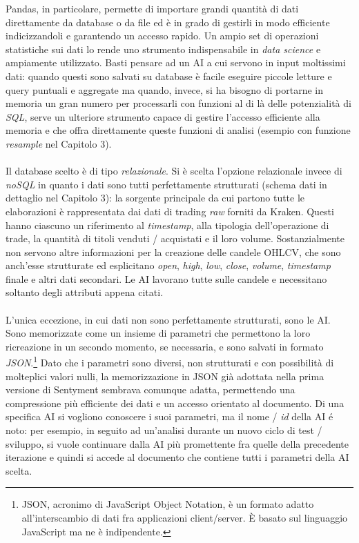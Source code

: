 \documentclass[a4paper,12pt]{report}
\begin{document}
Pandas, in particolare, permette di importare grandi quantità di dati direttamente da database o da file ed è in grado di gestirli in modo efficiente indicizzandoli e garantendo un accesso rapido. Un ampio set di operazioni statistiche sui dati lo rende uno strumento indispensabile in \textit{data science} e ampiamente utilizzato. Basti pensare ad un AI a cui servono in input moltissimi dati: quando questi sono salvati su database è facile eseguire piccole letture e query puntuali e aggregate ma quando, invece, si ha bisogno di portarne in memoria un gran numero per processarli con funzioni al di là delle potenzialità di \textit{SQL}, serve un ulteriore strumento capace di gestire l'accesso efficiente alla memoria e che offra direttamente queste funzioni di analisi (esempio con funzione \textit{resample} nel Capitolo 3).\\~\\ Il database scelto è di tipo \textit{relazionale}. Si è scelta l'opzione relazionale invece di \textit{noSQL} in quanto i dati sono tutti perfettamente strutturati (schema dati in dettaglio nel Capitolo 3): la sorgente principale da cui partono tutte le elaborazioni è rappresentata dai dati di trading \textit{raw} forniti da Kraken. Questi hanno ciascuno un riferimento al \textit{timestamp}, alla tipologia dell'operazione di trade, la quantità di titoli venduti / acquistati e il loro volume. Sostanzialmente non servono altre informazioni per la creazione delle candele OHLCV, che sono anch'esse strutturate ed esplicitano \textit{open}, \textit{high}, \textit{low}, \textit{close}, \textit{volume}, \textit{timestamp} finale e altri dati secondari. Le AI lavorano tutte sulle candele e necessitano soltanto degli attributi appena citati.\\~\\
L'unica eccezione, in cui dati non sono perfettamente strutturati, sono le AI. Sono memorizzate come un insieme di parametri che permettono la loro ricreazione in un secondo momento, se necessaria, e sono salvati in formato \textit{JSON}.\footnote{JSON, acronimo di JavaScript Object Notation, è un formato adatto all'interscambio di dati fra applicazioni client/server. È basato sul linguaggio JavaScript ma ne è indipendente.} Dato che i parametri sono diversi, non strutturati e con possibilità di molteplici valori nulli, la memorizzazione in JSON già adottata nella prima versione di Sentyment sembrava comunque adatta, permettendo una compressione più efficiente dei dati e un accesso orientato al documento. Di una specifica AI si vogliono conoscere i suoi parametri, ma il nome / \textit{id} della AI é noto: per esempio, in seguito ad un'analisi durante un nuovo ciclo di test / sviluppo, si vuole continuare dalla AI più promettente fra quelle della precedente iterazione e quindi si accede al documento che contiene tutti i parametri della AI scelta.\\
\end{document}
